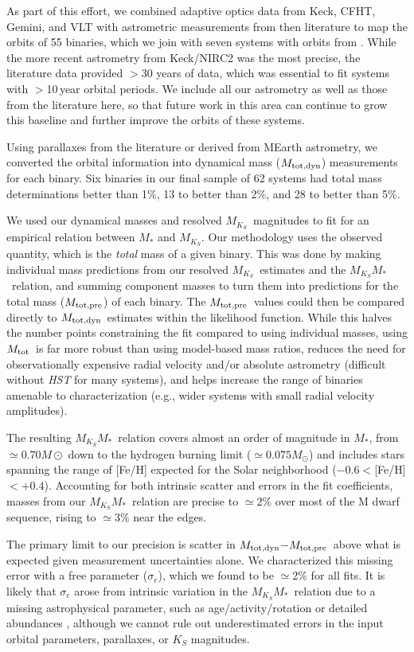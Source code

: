 \documentclass[twocolumn]{aastex62}
\newcommand{\mks}{$M_{K_S}$}
\newcommand{\mmk}{$M_{K_S}$\textendash$M_*$}
\newcommand{\mtot}{$M_{\rm{tot}}$}
\newcommand{\mpred}{$M_{\rm{tot,pre}}$}
\newcommand{\mdyn}{$M_{\rm{tot,dyn}}$}
\begin{document}
As part of this effort, we combined adaptive optics data from Keck, CFHT, Gemini, and VLT with astrometric measurements from then literature to map the orbits of 55 binaries, which we join with seven systems with orbits from \citet{Dupuy2017}. While the more recent astrometry from Keck/NIRC2 was the most precise, the literature data provided $>$30 years of data, which was essential to fit systems with $>$10\,year orbital periods. We include all our astrometry as well as those from the literature here, so that future work in this area can continue to grow this baseline and further improve the orbits of these systems.

Using parallaxes from the literature or derived from MEarth astrometry, we converted the orbital information into dynamical mass (\mdyn) measurements for each binary. Six binaries in our final sample of 62 systems had total mass determinations better than 1\%, 13 to better than 2\%, and 28 to better than 5\%. 

We used our dynamical masses and resolved \mks\ magnitudes to fit for an empirical relation between $M_*$ and \mks. Our methodology uses the observed quantity, which is the {\it total} mass of a given binary. This was done by making individual mass predictions from our resolved \mks\ estimates and the \mmk\ relation, and summing component masses to turn them into predictions for the total mass (\mpred) of each binary. The \mpred\ values could then be compared directly to \mdyn\ estimates within the likelihood function. While this halves the number points constraining the fit compared to using individual masses, using \mtot\ is far more robust than using model-based mass ratios, reduces the need for observationally expensive radial velocity and/or absolute astrometry (difficult without {\it HST} for many systems), and helps increase the range of binaries amenable to characterization (e.g., wider systems with small radial velocity amplitudes). 

The resulting \mmk\ relation covers almost an order of magnitude in $M_*$, from $\simeq0.70M\odot$ down to the hydrogen burning limit ($\simeq0.075M_\odot$) and includes stars spanning the range of [Fe/H] expected for the Solar neighborhood ($-0.6<$[Fe/H]$<+0.4$). Accounting for both intrinsic scatter and errors in the fit coefficients, masses from our \mmk\ relation are precise to $\simeq$2\% over most of the M dwarf sequence, rising to $\simeq3\%$ near the edges. 

The primary limit to our precision is scatter in \mdyn$-$\mpred\ above what is expected given measurement uncertainties alone. We characterized this missing error with a free parameter ($\sigma_e$), which we found to be $\simeq$2\% for all fits. It is likely that $\sigma_e$ arose from intrinsic variation in the \mmk\ relation due to a missing astrophysical parameter, such as age/activity/rotation \citep[e.g.,][]{Kraus2011,Feiden2016,Somers2017} or detailed abundances \citep[e.g.,][]{2017A&A...604A..97L,Veyette2017}, although we cannot rule out underestimated errors in the input orbital parameters, parallaxes, or $K_S$ magnitudes. 
\end{document}
